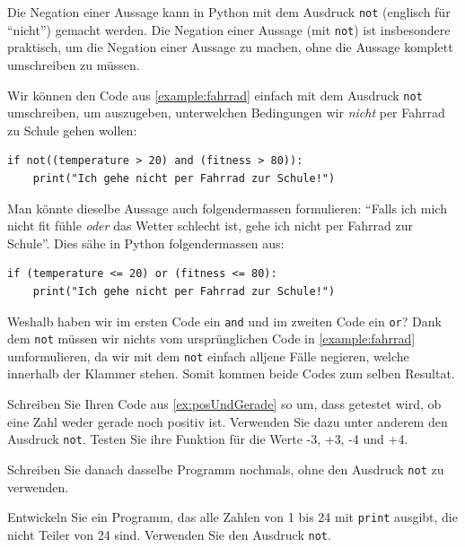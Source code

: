Die Negation einer Aussage kann in Python mit dem Ausdruck \lstinline|not| (englisch für \enquote{nicht}) gemacht werden. Die Negation einer Aussage (mit \lstinline|not|) ist insbesondere praktisch, um die Negation einer Aussage zu machen, ohne die Aussage komplett umschreiben zu müssen.

\begin{myexample}
Wir können den Code aus \cref{example:fahrrad} einfach mit dem Ausdruck \lstinline|not| umschreiben, um auszugeben, unterwelchen Bedingungen wir \textit{nicht} per Fahrrad zu Schule gehen wollen:
\begin{lstlisting}
if not((temperature > 20) and (fitness > 80)):
	print("Ich gehe nicht per Fahrrad zur Schule!")
\end{lstlisting}
Man könnte dieselbe Aussage auch folgendermassen formulieren: \enquote{Falls ich mich nicht fit fühle \textit{oder} das Wetter schlecht ist, gehe ich nicht per Fahrrad zur Schule}. Dies sähe in Python folgendermassen aus:
\begin{lstlisting}
if (temperature <= 20) or (fitness <= 80):
	print("Ich gehe nicht per Fahrrad zur Schule!")
\end{lstlisting}
Weshalb haben wir im ersten Code ein \lstinline|and| und im zweiten Code ein \lstinline|or|? Dank dem \lstinline|not| müssen wir nichts vom ursprünglichen Code in \cref{example:fahrrad} umformulieren, da wir mit dem \lstinline|not| einfach alljene Fälle negieren, welche innerhalb der Klammer stehen. Somit kommen beide Codes zum selben Resultat.
\end{myexample}

\begin{myexercise}
	Schreiben Sie Ihren Code aus \cref{ex:posUndGerade} so um, dass getestet wird, ob eine Zahl weder gerade noch positiv ist. Verwenden Sie dazu unter anderem den Ausdruck \lstinline|not|. Testen Sie ihre Funktion für die Werte -3, +3, -4 und +4.

	Schreiben Sie danach dasselbe Programm nochmals, ohne den Ausdruck \lstinline|not| zu verwenden.
	\begin{myanswer}
		
	\end{myanswer}
\end{myexercise}

\begin{myexercise}
	Entwickeln Sie ein Programm, das alle Zahlen von 1 bis 24 mit \lstinline|print| ausgibt, die nicht Teiler von 24 sind. Verwenden Sie den Ausdruck \lstinline|not|.
	\begin{myanswer}
		
	\end{myanswer}
\end{myexercise}
\newpage

